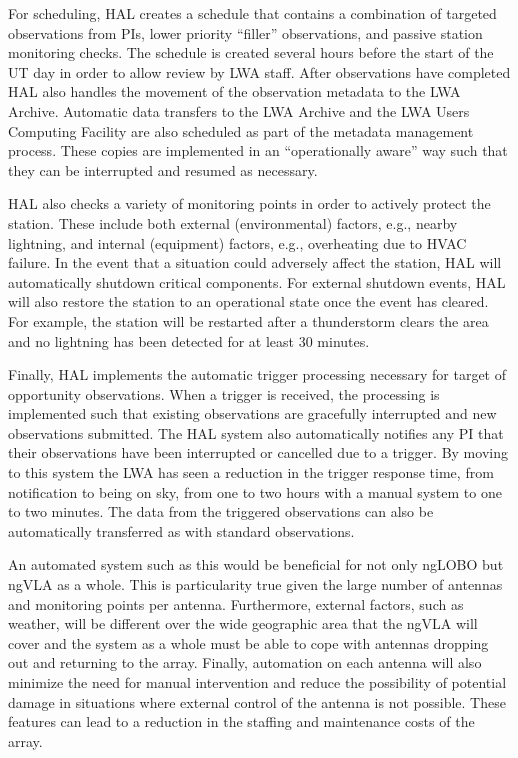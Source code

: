 \documentclass[11pt]{article}
\begin{document}
For scheduling, HAL creates a schedule that contains a combination of
targeted observations from PIs, lower priority ``filler'' observations,
and passive station monitoring checks.  The schedule is created several
hours before the start of the UT day in order to allow review by LWA
staff.  After observations have completed HAL also handles the movement
of the observation metadata to the LWA Archive.  Automatic  data
transfers to the LWA Archive and the LWA Users Computing Facility are also
scheduled as part of the metadata management process.  These copies are
implemented in an ``operationally aware'' way such that they can be
interrupted and resumed as necessary.

HAL also checks a variety of monitoring points in order to actively
protect the station.  These include both external (environmental)
factors, e.g., nearby lightning, and internal (equipment) factors, e.g.,
overheating due to HVAC failure.  In the event that a situation could
adversely affect the station, HAL will automatically shutdown critical
components.  For external shutdown events, HAL will also restore the
station to an operational state once the event has cleared.  For
example, the station will be restarted after a thunderstorm clears the
area and no lightning has been detected for at least 30 minutes.

Finally, HAL implements the automatic trigger processing necessary for
target of opportunity observations.  When a trigger is received, the
processing is implemented such that existing observations are gracefully
interrupted and new observations submitted.  The HAL system also
automatically notifies any PI that their observations have been
interrupted or cancelled due to a trigger.  By moving to this system the
LWA has seen a reduction in the trigger response time, from notification
to being on sky, from one to two hours with a manual system to one to
two minutes.  The data from the triggered observations can 
also be automatically transferred as with standard observations.

An automated system such as this would be beneficial for not only
ngLOBO but ngVLA as a whole.  This is particularity true given the large
number of antennas and monitoring points per antenna.  Furthermore,
external factors, such as weather, will be different over the wide
geographic area that the ngVLA will cover and the system as a whole must
be able to cope with antennas dropping out and returning to the array.
Finally, automation on each antenna will also minimize the need for
manual intervention and reduce the possibility of potential damage in
situations where external control of the antenna is not possible.  These
features can lead to a reduction in the staffing and maintenance costs
of the array.
\end{document}
